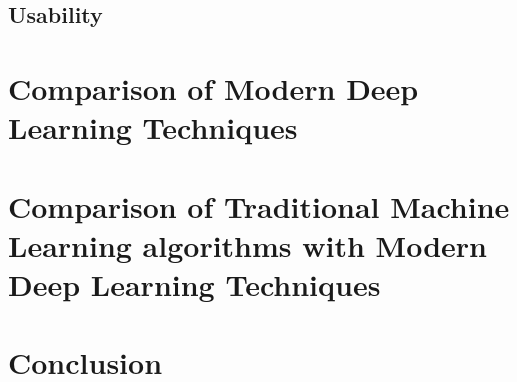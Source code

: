 \subsection{Usability}

\section{Comparison of Modern Deep Learning Techniques}

\section{Comparison of Traditional Machine Learning algorithms with Modern Deep Learning Techniques}

\section{Conclusion}
